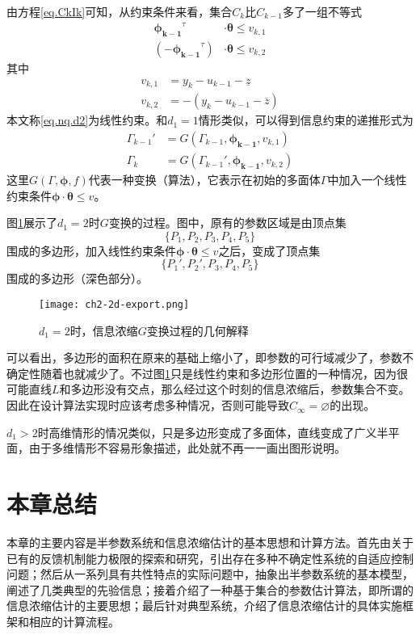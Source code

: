 由方程\eqref{eq.CkIk}可知，从约束条件来看，集合$C_{k}$比$C_{k-1}$多了一组不等式
\begin{equation}%
\label{eq.nq.d2}
\begin{split}%
\bm{\phi_{k-1}}^{\tau}&\cdot\bm{\theta}\leq v_{k,1}\\
(-\bm{\phi_{k-1}}^{\tau})&\cdot\bm{\theta}\leq v_{k,2}
\end{split}
\end{equation}
其中
\begin{equation}%
\label{eq:2.v}
\begin{split}%
v_{k,1}&=y_{k}-u_{k-1}-\underline{z}\\
v_{k,2}&=-(y_{k}-u_{k-1}-\overline{z})
\end{split}
\end{equation}
本文称\eqref{eq.nq.d2}为线性约束。和$d_{1}=1$情形类似，可以得到信息约束的递推形式为
\begin{equation}
\begin{split}%
\Gamma_{k-1}'&=G(\Gamma_{k-1},\bm{\phi_{k-1}},v_{k,1})\\
\Gamma_{k}&=G(\Gamma_{k-1}',\bm{\phi_{k-1}},v_{k,2})
\end{split}
\end{equation}
这里$G(\Gamma,\bm{\phi},f)$代表一种变换（算法），它表示在初始的多面体$\Gamma$中加入一个线性约束条件$\bm{\phi}\cdot\bm{\theta}\leq v$。

图\ref{fig.2d.export}展示了$d_{1}=2$时$G$变换的过程。图中，原有的参数区域是由顶点集
\begin{equation}%
\{P_{1},P_{2},P_{3},P_{4},P_{5}\}
\end{equation}
围成的多边形，加入线性约束条件$\bm{\phi}\cdot\bm{\theta}\leq v$之后，变成了顶点集
\begin{equation}%
\{P_{1}',P_{2}',P_{3},P_{4},P_{5}\}
\end{equation}
围成的多边形（深色部分）。

\begin{figure}[htb]
	\centering
	\texttt{[image: ch2-2d-export.png]}\\	 %
	\caption{$d_{1}=2$时，信息浓缩$G$变换过程的几何解释}
	\label{fig.2d.export}
\end{figure}

可以看出，多边形的面积在原来的基础上缩小了，即参数的可行域减少了，参数不确定性随着也就减少了。不过图\ref{fig.2d.export}只是线性约束和多边形位置的一种情况，因为很可能直线$L$和多边形没有交点，那么经过这个时刻的信息浓缩后，参数集合不变。因此在设计算法实现时应该考虑多种情况，否则可能导致$C_{\infty}=\varnothing$的出现。

$d_{1}>2$时高维情形的情况类似，只是多边形变成了多面体，直线变成了广义半平面，由于多维情形不容易形象描述，此处就不再一一画出图形说明。

\section{本章总结}
本章的主要内容是半参数系统和信息浓缩估计的基本思想和计算方法。首先由关于已有的反馈机制能力极限的探索和研究，引出存在多种不确定性系统的自适应控制问题；然后从一系列具有共性特点的实际问题中，抽象出半参数系统的基本模型，阐述了几类典型的先验信息；接着介绍了一种基于集合的参数估计算法，即所谓的信息浓缩估计的主要思想；最后针对典型系统，介绍了信息浓缩估计的具体实施框架和相应的计算流程。